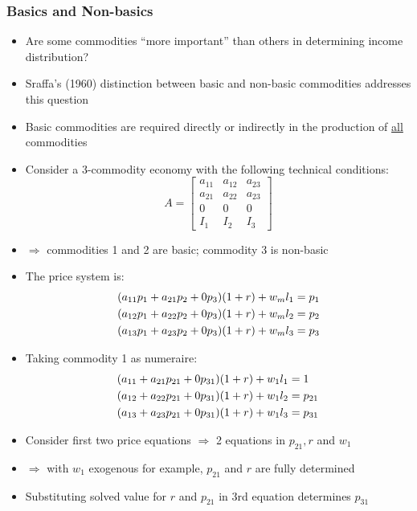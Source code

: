\documentclass[a4paper,twoside]{article}
\numberwithin{equation}{section}
\numberwithin{figure}{section}
\begin{document}
\subsubsection{Basics and Non-basics}
	\begin{itemize}
		\item Are some commodities ``more important'' than others in determining income distribution? 
		\item Sraffa's (1960) distinction between basic and non-basic commodities addresses this question
		\item Basic commodities are required directly or indirectly in the production of \underline{all} commodities
		\item  Consider a 3-commodity economy with the following technical conditions:
		\[
		A =
		\begin{bmatrix}
			a_{11} & a_{12} & a_{23} \\
			a_{21} & a_{22} & a_{23} \\
			0 & 0 & 0 \\
			I_1 & I_2 & I_3
		\end{bmatrix}
		\]
		\item \( \Rightarrow \) commodities 1 and 2 are basic; commodity 3 is non-basic
		\item  The price system is:
		\begin{gather}
			(a_{11} p_1 + a_{21} p_2 + 0p_3) (1+r) + w_m l_1 = p_1 \notag \\
			(a_{12} p_1 + a_{22} p_2 + 0p_3) (1+r) + w_m l_2 = p_2 \notag \\
			(a_{13} p_1 + a_{23} p_2 + 0p_3) (1+r) + w_m l_3 = p_3 \label{E:2.19}
		\end{gather}
		\item  Taking commodity 1 as numeraire: 
		\begin{align}
			(a_{11} + a_{21} p_{21} + 0p_{31}) (1+r) + w_1 l_1 &= 1 \notag \\
			(a_{12} + a_{22} p_{21} + 0p_{31}) (1+r) + w_1 l_2 &= p_{21} \notag \\
			(a_{13} + a_{23} p_{21} + 0p_{31}) (1+r) + w_1 l_3 &= p_{31} \label{E:2.20}
		\end{align}
		\item Consider first two price equations \( \Rightarrow \) 2 equations in \( p_{21}, r \) and \( w_1 \)
		\item \( \Rightarrow \) with \( w_1 \) exogenous for example, \( p_{21} \) and \( r \) are fully determined
		\item Substituting solved value for \( r \) and \( p_{21} \) in 3rd equation determines \( p_{31} \)

\end{itemize}
\end{document}
